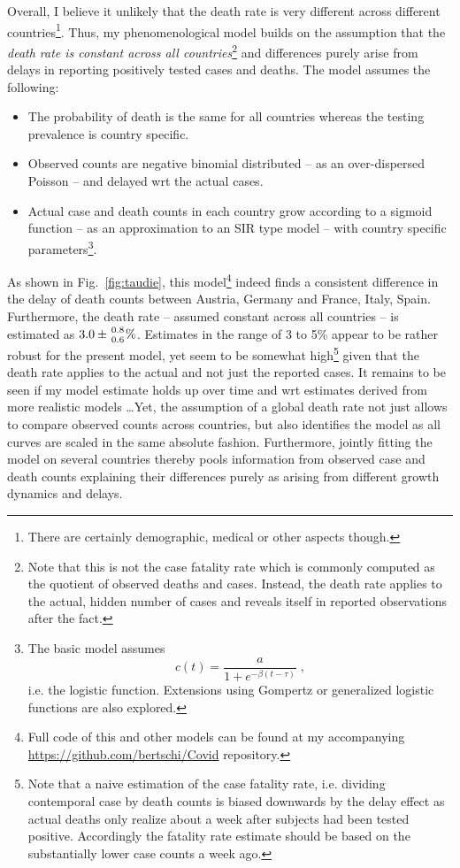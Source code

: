 \documentclass[a4paper]{tufte-handout}
\newcommand{\fig}[1]{Fig.~\ref{fig:#1}}
\begin{document}
Overall, I believe it unlikely that the death rate is very different
across different countries\footnote{There are certainly demographic,
  medical or other aspects though.}. Thus, my phenomenological model
builds on the assumption that the {\em death rate is constant across
  all countries}\footnote{Note that this is not the case fatality rate
  which is commonly computed as the quotient of observed deaths and
  cases. Instead, the death rate applies to the actual, hidden number
  of cases and reveals itself in reported observations after the
  fact.} and differences purely arise from delays in reporting
positively tested cases and deaths. The model assumes the following:
\begin{itemize}
\item The probability of death is the same for all countries whereas
  the testing prevalence is country specific.
\item Observed counts are negative binomial distributed -- as an
  over-dispersed Poisson -- and delayed wrt the actual cases.
\item Actual case and death counts in each country grow according to a
  sigmoid function -- as an approximation to an SIR type model -- with
  country specific parameters\footnote{The basic model assumes \[ c(t)
    = \frac{a}{1 + e^{- \beta (t - \tau)}} \; , \] i.e. the logistic
    function. Extensions using Gompertz or generalized logistic
    functions are also explored.}.
\end{itemize}

As shown in \fig{taudie}, this model\footnote{Full code of this and
  other models can be found at my accompanying
  \href{Github}{\url{https://github.com/bertschi/Covid}} repository.}
indeed finds a consistent difference in the delay of death counts
between Austria, Germany and France, Italy, Spain. Furthermore, the
death rate -- assumed constant across all countries -- is estimated as
$3.0 \pm {0.8 \atop 0.6} \%$. Estimates in the range of 3 to 5\%
appear to be rather robust for the present model, yet seem to be
somewhat high\footnote{Note that a naive estimation of the case
  fatality rate, i.e. dividing contemporal case by death counts is
  biased downwards by the delay effect as actual deaths only realize
  about a week after subjects had been tested positive. Accordingly
  the fatality rate estimate should be based on the substantially
  lower case counts a week ago.} given that the death rate applies to
the actual and not just the reported cases. It remains to be seen if my model
estimate holds up over time and wrt estimates derived from more
realistic models \ldots Yet, the assumption of a global death rate not
just allows to compare observed counts across countries, but also
identifies the model as all curves are scaled in the same absolute
fashion. Furthermore, jointly fitting the model on several countries
thereby pools information from observed case and death counts
explaining their differences purely as arising from different growth
dynamics and delays.
\end{document}
